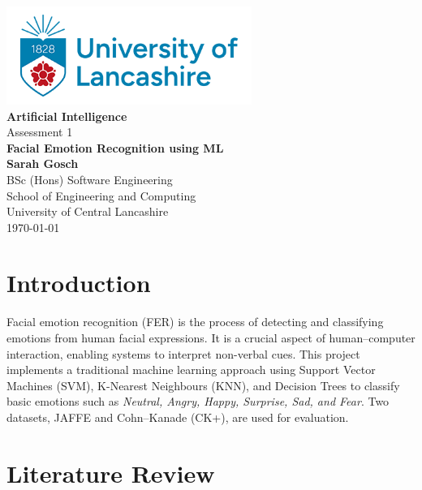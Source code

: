 \documentclass[12pt,a4paper]{article}
\begin{document}
	
	\begin{titlepage}
		\centering
		\vspace*{2cm}
		\includegraphics[width=8cm]{uclan-logo-placeholder.png}\\[1cm]
		
		{\Huge \bfseries Artificial Intelligence}\\
		{\large Assessment 1}\\[0.25cm]
		\vspace*{2cm}
		{\Huge \bfseries Facial Emotion Recognition using ML}\\
		
		\large \textbf{Sarah Gosch}\\[2cm]
		
		{\large BSc (Hons) Software Engineering}\\[0.25cm]
		{\large School of Engineering and Computing}\\[0.25cm]
		{\large University of Central Lancashire}\\[1.5cm]
		
		{\large \today}
		
		\vfill
	\end{titlepage}
	
	\tableofcontents
	\newpage
	
\section{Introduction}
Facial emotion recognition (FER) is the process of detecting and classifying emotions from human facial expressions. 
It is a crucial aspect of human–computer interaction, enabling systems to interpret non-verbal cues. 
This project implements a traditional machine learning approach using Support Vector Machines (SVM), 
K-Nearest Neighbours (KNN), and Decision Trees to classify basic emotions such as \textit{Neutral, Angry, Happy, Surprise, Sad, and Fear}. 
Two datasets, JAFFE and Cohn–Kanade (CK+), are used for evaluation.

\section{Literature Review}
\end{document}
